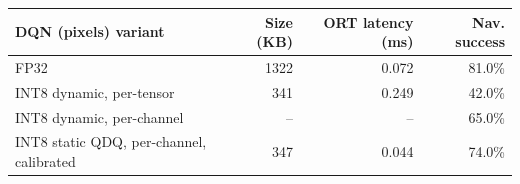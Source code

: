 \begin{tabular}{lrrr}
\toprule
DQN (pixels) variant & Size (KB) & ORT latency (ms) & Nav. success \\
\midrule
FP32 & 1322 & 0.072 & 81.0\% \\
INT8 dynamic, per-tensor & 341 & 0.249 & 42.0\% \\
INT8 dynamic, per-channel & -- & -- & 65.0\% \\
INT8 static QDQ, per-channel, calibrated & 347 & 0.044 & 74.0\% \\
\bottomrule
\end{tabular}

